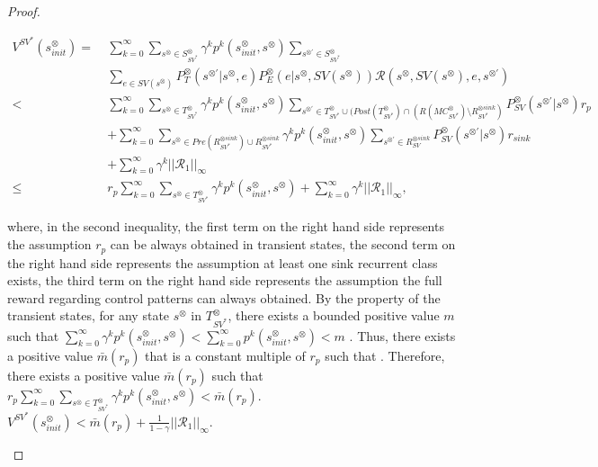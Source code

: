 \documentclass[10pt]{article}
\theoremstyle{definition}
\begin{document}
\begin{proof}
\begin{enumerate}
  \begin{align}
    V^{SV^{\ast}}\!(s^{\otimes}_{init})
    =\ & \sum_{k=0}^{\infty} \sum_{s^{\otimes} \in S^{\otimes}_{SV^{\ast}}} \gamma^k p^k(s^{\otimes}_{init}, s^{\otimes}) \sum_{s^{\otimes \prime} \in S^{\otimes}_{SV^{\ast}}} \nonumber \\
     & \sum_{e \in SV(s^{\otimes})} P^{\otimes}_T (s^{\otimes \prime} | s^{\otimes}, e) P^{\otimes}_E (e | s^{\otimes}, SV(s^{\otimes})) \mathcal{R}(s^{\otimes}, SV(s^{\otimes}), e, s^{\otimes \prime})  \nonumber \\
     <\ & \sum_{k=0}^{\infty} \sum_{s^{\otimes} \in T^{\otimes}_{SV^{\ast}}} \gamma^k p^k(s^{\otimes}_{init}, s^{\otimes}) \sum_{s^{\otimes \prime} \in T^{\otimes}_{SV^{\ast}} \cup ( Post(T^{\otimes}_{SV^{\ast}}) \cap (R(MC^{\otimes}_{SV^{\ast}}) \setminus R^{\otimes sink}_{SV^{\ast}})} P^{\otimes}_{SV} (s^{\otimes \prime} | s^{\otimes}) r_p \nonumber \\
     & + \sum_{k=0}^{\infty} \sum_{s^{\otimes} \in Pre(R^{\otimes sink}_{SV^{\ast}}) \cup R^{\otimes sink}_{SV^{\ast}}} \gamma^k p^k(s^{\otimes}_{init}, s^{\otimes}) \sum_{s^{\otimes \prime} \in R^{\otimes sink}_{SV}} P^{\otimes}_{SV}(s^{\otimes \prime}|s^{\otimes}) r_{sink}  \nonumber \\
     & + \sum_{k=0}^{\infty} \gamma^k ||\mathcal{R}_1||_{\infty} \nonumber \\
     \leq\ & r_p \sum_{k=0}^{\infty} \sum_{s^{\otimes} \in T^{\otimes}_{SV^{\ast}}} \gamma^k p^k(s^{\otimes}_{init}, s^{\otimes}) + \sum_{k=0}^{\infty} \gamma^k ||\mathcal{R}_1||_{\infty},
  \label{ineq_VSstar}
  \end{align}

  where, in the second inequality, the first term on the right hand side represents the assumption $r_p$ can be always obtained in transient states, the second term on the right hand side represents the assumption at least one sink recurrent class exists, the third term on the right hand side represents the assumption the full reward regarding control patterns can always obtained.
  By the property of the transient states, for any state $s^{\otimes}$ in $T^{\otimes}_{SV^{\ast}}$, there exists a bounded positive value $m$ such that $ \sum_{k=0}^{\infty} \gamma^k p^k(s^{\otimes}_{init}, s^{\otimes}) < \sum_{k=0}^{\infty} p^k(s^{\otimes}_{init}, s^{\otimes}) < m$ \cite{ESS}. Thus, there exists a positive value $\bar{m}(r_p)$ that is a constant multiple of $r_p$ such that . Therefore, there exists a positive value $\bar{m}(r_p)$ such that $r_p \sum_{k=0}^{\infty} \sum_{s^{\otimes} \in T^{\otimes}_{SV^{\ast}}} \gamma^k p^k(s^{\otimes}_{init}, s^{\otimes}) < \bar{m}(r_p)$. $V^{SV^{\ast}}(s^{\otimes}_{init}) < \bar{m}(r_p) + \frac{1}{1-\gamma} ||\mathcal{R}_1||_{\infty}$.


\end{enumerate}
\end{proof}
\end{document}
